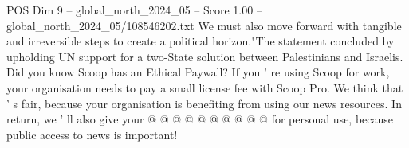 \begin{textsample}{POS Dim 9 – global\_north\_2024\_05 – Score 1.00 – global\_north\_2024\_05/108546202.txt}
We must also move forward with tangible and irreversible steps to create a political horizon."The statement concluded by upholding UN support for a two-State solution between Palestinians and Israelis.
Did you know Scoop has an Ethical Paywall?
If you ' re using Scoop for work, your organisation needs to pay a small license fee with Scoop Pro.
We think that ' s fair, because your organisation is benefiting from using our news resources.
In return, we ' ll also give your @ @ @ @ @ @ @ @ @ @ for personal use, because public access to news is important!

\end{textsample}

